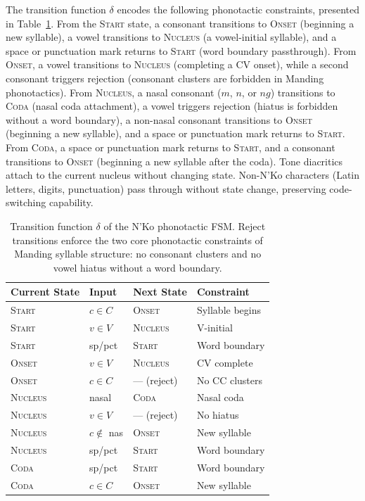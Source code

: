 \documentclass[11pt]{article}
\newcommand{\nko}{N'Ko}
\begin{document}
The transition function $\delta$ encodes the following phonotactic constraints, presented in Table~\ref{tab:fsm}. From the \textsc{Start} state, a consonant transitions to \textsc{Onset} (beginning a new syllable), a vowel transitions to \textsc{Nucleus} (a vowel-initial syllable), and a space or punctuation mark returns to \textsc{Start} (word boundary passthrough). From \textsc{Onset}, a vowel transitions to \textsc{Nucleus} (completing a CV onset), while a second consonant triggers rejection (consonant clusters are forbidden in Manding phonotactics). From \textsc{Nucleus}, a nasal consonant ($m$, $n$, or $ng$) transitions to \textsc{Coda} (nasal coda attachment), a vowel triggers rejection (hiatus is forbidden without a word boundary), a non-nasal consonant transitions to \textsc{Onset} (beginning a new syllable), and a space or punctuation mark returns to \textsc{Start}. From \textsc{Coda}, a space or punctuation mark returns to \textsc{Start}, and a consonant transitions to \textsc{Onset} (beginning a new syllable after the coda). Tone diacritics attach to the current nucleus without changing state. Non-\nko{} characters (Latin letters, digits, punctuation) pass through without state change, preserving code-switching capability.

\begin{table}[t]
\centering
\small
\caption{Transition function $\delta$ of the \nko{} phonotactic FSM. Reject transitions enforce the two core phonotactic constraints of Manding syllable structure: no consonant clusters and no vowel hiatus without a word boundary.}
\label{tab:fsm}
\begin{tabular}{@{}llll@{}}
\toprule
Current State & Input & Next State & Constraint \\
\midrule
\textsc{Start} & $c \in C$ & \textsc{Onset} & Syllable begins \\
\textsc{Start} & $v \in V$ & \textsc{Nucleus} & V-initial \\
\textsc{Start} & sp/pct & \textsc{Start} & Word boundary \\
\textsc{Onset} & $v \in V$ & \textsc{Nucleus} & CV complete \\
\textsc{Onset} & $c \in C$ & --- (reject) & No CC clusters \\
\textsc{Nucleus} & nasal & \textsc{Coda} & Nasal coda \\
\textsc{Nucleus} & $v \in V$ & --- (reject) & No hiatus \\
\textsc{Nucleus} & $c \notin$ nas & \textsc{Onset} & New syllable \\
\textsc{Nucleus} & sp/pct & \textsc{Start} & Word boundary \\
\textsc{Coda} & sp/pct & \textsc{Start} & Word boundary \\
\textsc{Coda} & $c \in C$ & \textsc{Onset} & New syllable \\
\bottomrule
\end{tabular}
\end{table}
\end{document}
